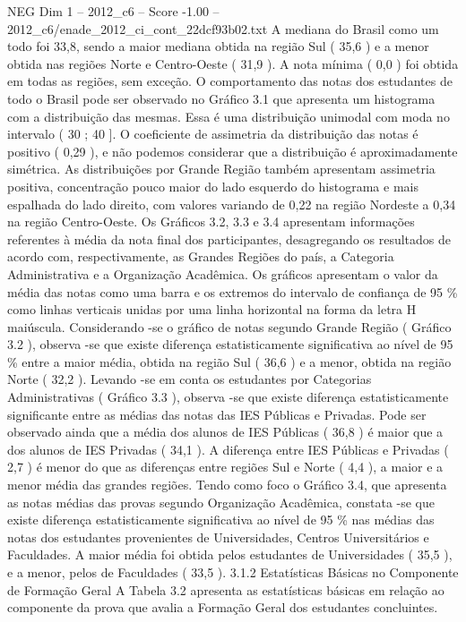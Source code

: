 \begin{textsample}{NEG Dim 1 – 2012\_c6 – Score -1.00 – 2012\_c6/enade\_2012\_ci\_cont\_22dcf93b02.txt}
A mediana do Brasil como um todo foi 33,8, sendo a maior mediana obtida na região Sul ( 35,6 ) e a menor obtida nas regiões Norte e Centro-Oeste ( 31,9 ).
A nota mínima ( 0,0 ) foi obtida em todas as regiões, sem exceção.
O comportamento das notas dos estudantes de todo o Brasil pode ser observado no Gráfico 3.1 que apresenta um histograma com a distribuição das mesmas.
Essa é uma distribuição unimodal com moda no intervalo ( 30 ; 40 ].
O coeficiente de assimetria da distribuição das notas é positivo ( 0,29 ), e não podemos considerar que a distribuição é aproximadamente simétrica.
As distribuições por Grande Região também apresentam assimetria positiva, concentração pouco maior do lado esquerdo do histograma e mais espalhada do lado direito, com valores variando de 0,22 na região Nordeste a 0,34 na região Centro-Oeste.
Os Gráficos 3.2, 3.3 e 3.4 apresentam informações referentes à média da nota final dos participantes, desagregando os resultados de acordo com, respectivamente, as Grandes Regiões do país, a Categoria Administrativa e a Organização Acadêmica.
Os gráficos apresentam o valor da média das notas como uma barra e os extremos do intervalo de confiança de 95 \% como linhas verticais unidas por uma linha horizontal na forma da letra H maiúscula.
Considerando -se o gráfico de notas segundo Grande Região ( Gráfico 3.2 ), observa -se que existe diferença estatisticamente significativa ao nível de 95 \% entre a maior média, obtida na região Sul ( 36,6 ) e a menor, obtida na região Norte ( 32,2 ).
Levando -se em conta os estudantes por Categorias Administrativas ( Gráfico 3.3 ), observa -se que existe diferença estatisticamente significante entre as médias das notas das IES Públicas e Privadas.
Pode ser observado ainda que a média dos alunos de IES Públicas ( 36,8 ) é maior que a dos alunos de IES Privadas ( 34,1 ).
A diferença entre IES Públicas e Privadas ( 2,7 ) é menor do que as diferenças entre regiões Sul e Norte ( 4,4 ), a maior e a menor média das grandes regiões.
Tendo como foco o Gráfico 3.4, que apresenta as notas médias das provas segundo Organização Acadêmica, constata -se que existe diferença estatisticamente significativa ao nível de 95 \% nas médias das notas dos estudantes provenientes de Universidades, Centros Universitários e Faculdades.
A maior média foi obtida pelos estudantes de Universidades ( 35,5 ), e a menor, pelos de Faculdades ( 33,5 ). 3.1.2 Estatísticas Básicas no Componente de Formação Geral A Tabela 3.2 apresenta as estatísticas básicas em relação ao componente da prova que avalia a Formação Geral dos estudantes concluintes.

\end{textsample}
